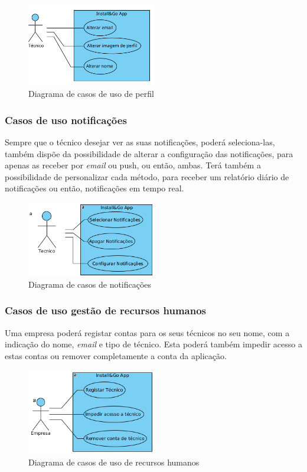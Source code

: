 \begin{figure}[htb]
  \centering
  
  \includegraphics[width=0.5\textwidth]{images/diagramas/casos_de_uso/use_case_perfil.png}
  \caption{Diagrama de casos de uso de perfil}
  \label{fig:17}
\end{figure}

\newpage

\subsubsection{Casos de uso notificações}

Sempre que o técnico desejar ver as suas notificações, poderá seleciona-las, também dispõe da possibilidade de alterar a configuração das notificações, para apenas as receber por \textit{email} ou push, ou então, ambas. Terá também a possibilidade de personalizar cada método, para receber um relatório diário de notificações ou então, notificações em tempo real.

\begin{figure}[htb]
  \centering
  \includegraphics[width=0.5\textwidth]{images/diagramas/casos_de_uso/use_case_notificacoes.png}
  \caption{Diagrama de casos de notificações}
  \label{fig:18}
\end{figure}

\subsubsection{Casos de uso gestão de recursos humanos}

Uma empresa poderá registar contas para os seus técnicos no seu nome, com a indicação do nome, \textit{email} e tipo de técnico. Esta poderá também impedir acesso a estas contas ou remover completamente a conta da aplicação.

\begin{figure}[htb]
  \centering
  \includegraphics[width=0.5\textwidth]{images/diagramas/casos_de_uso/use_case_rec_humanos.png}
  \caption{Diagrama de casos de uso de recursos humanos}
  \label{fig:19}
\end{figure}